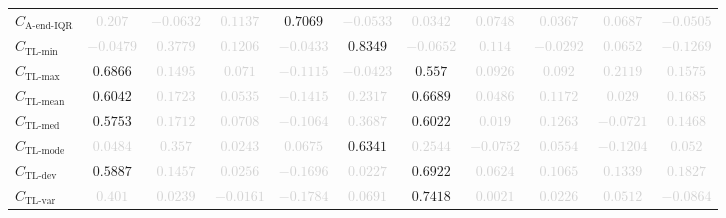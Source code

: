 \documentclass{standalone}
\newcommand{\lastiqrname}{\text{A-end-IQR}}
\newcommand{\lastiqr}{C_{\lastiqrname}}
\newcommand{\tlminname}{\text{TL-min}}
\newcommand{\tlmin}{C_{\tlminname}}
\newcommand{\tlavgname}{\text{TL-mean}}
\newcommand{\tlavg}{C_{\tlavgname}}
\newcommand{\tlmaxname}{\text{TL-max}}
\newcommand{\tlmax}{C_{\tlmaxname}}
\newcommand{\tlmedname}{\text{TL-med}}
\newcommand{\tlmed}{C_{\tlmedname}}
\newcommand{\tlmodename}{\text{TL-mode}}
\newcommand{\tlmode}{C_{\tlmodename}}
\newcommand{\tldevname}{\text{TL-dev}}
\newcommand{\tldev}{C_{\tldevname}}
\newcommand{\tlvarname}{\text{TL-var}}
\newcommand{\tlvar}{C_{\tlvarname}}
\begin{document}
\begin{tabular}{lcccccccccc}
$\lastiqr$ & \textcolor{lightgray}{$0.207$} & \textcolor{lightgray}{$-0.0632$} & \textcolor{lightgray}{$0.1137$} & $0.7069$ & \textcolor{lightgray}{$-0.0533$} & \textcolor{lightgray}{$0.0342$} & \textcolor{lightgray}{$0.0748$} & \textcolor{lightgray}{$0.0367$} & \textcolor{lightgray}{$0.0687$} & \textcolor{lightgray}{$-0.0505$} \\ 
$\tlmin$ & \textcolor{lightgray}{$-0.0479$} & \textcolor{lightgray}{$0.3779$} & \textcolor{lightgray}{$0.1206$} & \textcolor{lightgray}{$-0.0433$} & $0.8349$ & \textcolor{lightgray}{$-0.0652$} & \textcolor{lightgray}{$0.114$} & \textcolor{lightgray}{$-0.0292$} & \textcolor{lightgray}{$0.0652$} & \textcolor{lightgray}{$-0.1269$} \\ 
$\tlmax$ & $0.6866$ & \textcolor{lightgray}{$0.1495$} & \textcolor{lightgray}{$0.071$} & \textcolor{lightgray}{$-0.1115$} & \textcolor{lightgray}{$-0.0423$} & $0.557$ & \textcolor{lightgray}{$0.0926$} & \textcolor{lightgray}{$0.092$} & \textcolor{lightgray}{$0.2119$} & \textcolor{lightgray}{$0.1575$} \\ 
$\tlavg$ & $0.6042$ & \textcolor{lightgray}{$0.1723$} & \textcolor{lightgray}{$0.0535$} & \textcolor{lightgray}{$-0.1415$} & \textcolor{lightgray}{$0.2317$} & $0.6689$ & \textcolor{lightgray}{$0.0486$} & \textcolor{lightgray}{$0.1172$} & \textcolor{lightgray}{$0.029$} & \textcolor{lightgray}{$0.1685$} \\ 
$\tlmed$ & $0.5753$ & \textcolor{lightgray}{$0.1712$} & \textcolor{lightgray}{$0.0708$} & \textcolor{lightgray}{$-0.1064$} & \textcolor{lightgray}{$0.3687$} & $0.6022$ & \textcolor{lightgray}{$0.019$} & \textcolor{lightgray}{$0.1263$} & \textcolor{lightgray}{$-0.0721$} & \textcolor{lightgray}{$0.1468$} \\ 
$\tlmode$ & \textcolor{lightgray}{$0.0484$} & \textcolor{lightgray}{$0.357$} & \textcolor{lightgray}{$0.0243$} & \textcolor{lightgray}{$0.0675$} & $0.6341$ & \textcolor{lightgray}{$0.2544$} & \textcolor{lightgray}{$-0.0752$} & \textcolor{lightgray}{$0.0554$} & \textcolor{lightgray}{$-0.1204$} & \textcolor{lightgray}{$0.052$} \\ 
$\tldev$ & $0.5887$ & \textcolor{lightgray}{$0.1457$} & \textcolor{lightgray}{$0.0256$} & \textcolor{lightgray}{$-0.1696$} & \textcolor{lightgray}{$0.0227$} & $0.6922$ & \textcolor{lightgray}{$0.0624$} & \textcolor{lightgray}{$0.1065$} & \textcolor{lightgray}{$0.1339$} & \textcolor{lightgray}{$0.1827$} \\ 
$\tlvar$ & \textcolor{lightgray}{$0.401$} & \textcolor{lightgray}{$0.0239$} & \textcolor{lightgray}{$-0.0161$} & \textcolor{lightgray}{$-0.1784$} & \textcolor{lightgray}{$0.0691$} & $0.7418$ & \textcolor{lightgray}{$0.0021$} & \textcolor{lightgray}{$0.0226$} & \textcolor{lightgray}{$0.0512$} & \textcolor{lightgray}{$-0.0864$} \\ 

\end{tabular}
\end{document}

